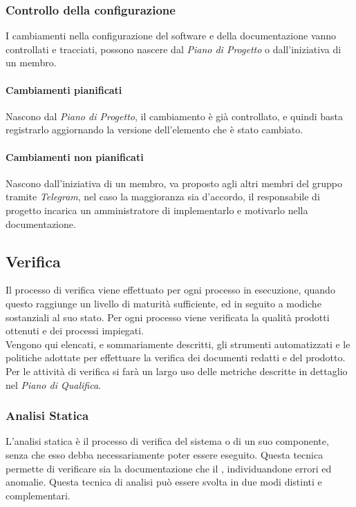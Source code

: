       \subsubsection{Controllo della configurazione}
      I cambiamenti nella configurazione del software e della documentazione vanno controllati e tracciati, possono nascere dal \emph{Piano di Progetto} o dall'iniziativa di un membro.
      \paragraph{Cambiamenti pianificati}
	Nascono dal \emph{Piano di Progetto}, il cambiamento è già controllato, e quindi basta registrarlo aggiornando la versione dell'elemento che è stato cambiato.
	\paragraph{Cambiamenti non pianificati}
	Nascono dall'iniziativa di un membro, va proposto agli altri membri del gruppo tramite \emph{Telegram}, nel caso la maggioranza sia d'accordo, il responsabile di progetto incarica un amministratore di implementarlo e motivarlo nella documentazione.



      
  \subsection{Verifica}
  Il processo di verifica viene effettuato per ogni processo in esecuzione, quando questo raggiunge un livello di maturità sufficiente, ed in seguito a modiche sostanziali al suo stato. Per ogni processo viene verificata la qualità prodotti ottenuti e dei processi impiegati.\\
  Vengono qui elencati, e sommariamente descritti, gli strumenti automatizzati e le politiche adottate per effettuare la verifica dei documenti redatti e del  prodotto.\\
  Per le attività di verifica si farà un largo uso delle metriche descritte in dettaglio nel \textit{Piano di Qualifica}.

\subsubsection{Analisi Statica}
    L'analisi statica è il processo di verifica del sistema o di un suo componente, senza che esso debba necessariamente poter essere eseguito.
    Questa tecnica permette di verificare sia la documentazione che il , individuandone errori ed anomalie. Questa tecnica di analisi può essere svolta in due modi distinti e complementari.
    
